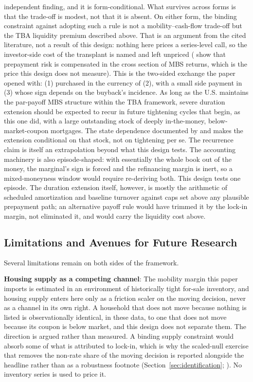 \documentclass[12pt]{article}
\begin{document}
independent finding, and it is form-conditional. What survives across forms is that the trade-off is modest, not that it is absent. On either form, the binding constraint against adopting such a rule is not a mobility--cash-flow trade-off but the TBA liquidity premium described above. That is an argument from the cited literature, not a result of this design: nothing here prices a series-level call, so the investor-side cost of the transplant is named and left unpriced (\citet{diep2021} show that prepayment risk is compensated in the cross section of MBS returns, which is the price this design does not measure). This is the two-sided exchange the paper opened with: (1) purchased in the currency of (2), with a small side payment in (3) whose sign depends on the buyback's incidence. As long as the U.S. maintains the par-payoff MBS structure within the TBA framework, severe duration extension should be expected to recur in future tightening cycles that begin, as this one did, with a large outstanding stock of deeply in-the-money, below-market-coupon mortgages. The state dependence documented by \citet{berger2021} and \citet{eichenbaum2022} makes the extension conditional on that stock, not on tightening per se. The recurrence claim is itself an extrapolation beyond what this design tests. The accounting machinery is also episode-shaped: with essentially the whole book out of the money, the marginal's sign is forced and the refinancing margin is inert, so a mixed-moneyness window would require re-deriving both. This design tests one episode. The duration extension itself, however, is mostly the arithmetic of scheduled amortization and baseline turnover against caps set above any plausible prepayment path; an alternative payoff rule would have trimmed it by the lock-in margin, not eliminated it, and would carry the liquidity cost above.

\subsection{Limitations and Avenues for Future Research}\label{sec:limitations}

Several limitations remain on both sides of the framework.

\textbf{Housing supply as a competing channel}: The mobility margin this paper imports is estimated in an environment of historically tight for-sale inventory, and housing supply enters here only as a friction scaler on the moving decision, never as a channel in its own right. A household that does not move because nothing is listed is observationally identical, in these data, to one that does not move because its coupon is below market, and this design does not separate them. The direction is argued rather than measured. A binding supply constraint would absorb some of what is attributed to lock-in, which is why the scaled-null exercise that removes the non-rate share of the moving decision is reported alongside the headline rather than as a robustness footnote (Section~\ref{sec:identification}; \citealp{aladangady2024,hsieh2019}). No inventory series is used to price it.
\end{document}
